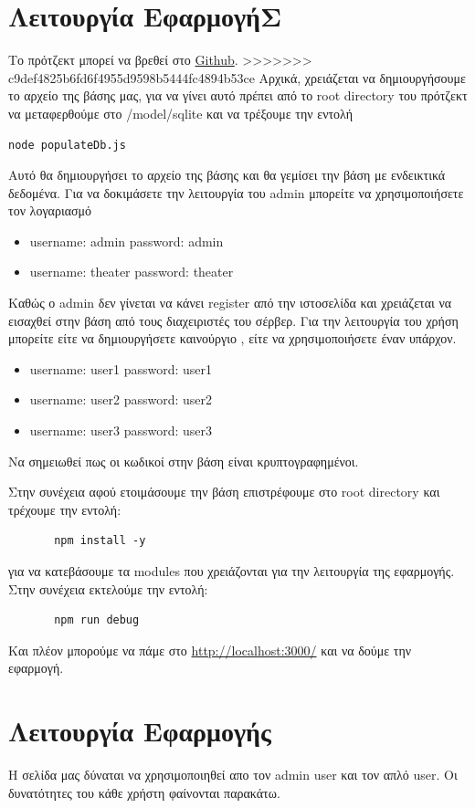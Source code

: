 \documentclass{acmart}
\begin{document}
\section{Λειτουργία ΕφαρμογήΣ}
Το πρότζεκτ μπορεί να βρεθεί στο \href{https://github.com/KonstantoJr/web_dev_project}{Github}.
>>>>>>> c9def4825b6fd6f4955d9598b5444fc4894b53ce
Αρχικά, χρειάζεται να δημιουργήσουμε το αρχείο της βάσης μας, για να γίνει αυτό πρέπει από το root directory
του πρότζεκτ να μεταφερθούμε στο /model/sqlite και να τρέξουμε την εντολή 
\begin{lstlisting}
node populateDb.js 
\end{lstlisting}
Αυτό θα δημιουργήσει το αρχείο της βάσης και θα γεμίσει την βάση με ενδεικτικά δεδομένα.
Για να δοκιμάσετε την λειτουργία του admin μπορείτε να χρησιμοποιήσετε τον λογαριασμό 
\begin{itemize}
       \item username: admin password: admin
       \item username: theater password: theater
\end{itemize}
Καθώς ο admin δεν γίνεται να κάνει register από την ιστοσελίδα και χρειάζεται να εισαχθεί στην βάση από τους 
διαχειριστές του σέρβερ.
Για την λειτουργία του χρήση μπορείτε είτε να δημιουργήσετε καινούργιο , είτε να χρησιμοποιήσετε έναν υπάρχον.
\begin{itemize}
       \item username: user1 password: user1
       \item username: user2 password: user2
       \item username: user3 password: user3     
\end{itemize}
Να σημειωθεί πως οι κωδικοί στην βάση είναι κρυπτογραφημένοι.

Στην συνέχεια αφού ετοιμάσουμε την βάση επιστρέφουμε στο root directory και τρέχουμε την εντολή:
\begin{lstlisting}
       npm install -y 
\end{lstlisting}
για να κατεβάσουμε τα modules που χρειάζονται για την λειτουργία της εφαρμογής.
Στην συνέχεια εκτελούμε την εντολή:
\begin{lstlisting}
       npm run debug
\end{lstlisting}
Και πλέον μπορούμε να πάμε στο \url{http://localhost:3000/} και να δούμε την εφαρμογή.


\section{Λειτουργία Εφαρμογής}
Η σελίδα μας δύναται να χρησιμοποιηθεί απο τον admin user και τον απλό user. Οι δυνατότητες του κάθε χρήστη φαίνονται παρακάτω.
\end{document}
